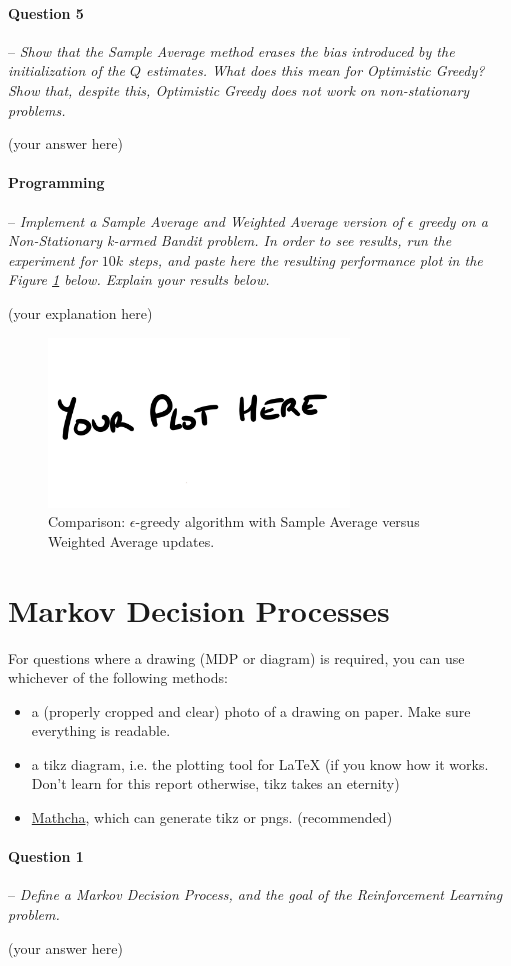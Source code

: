 \documentclass[a4paper]{article}
\newcommand{\question}[2]{
\paragraph{Question #1} -- \textit{#2}

}
\newcommand{\programming}[1]{
\paragraph{Programming} -- \textit{#1}

}
\begin{document}
		\question{5}{Show that the Sample Average method erases the bias introduced by the initialization of the $Q$ estimates. 
				What does this mean for Optimistic Greedy? Show that, despite this, Optimistic Greedy does not work on non-stationary problems.}
			(your answer here)

		\programming{Implement a Sample Average and Weighted Average version of $\epsilon$ greedy on a Non-Stationary k-armed Bandit problem. 
				In order to see results, run the experiment for $10k$ steps, and paste here the resulting performance plot in the Figure \ref{fig:sa_vs_wa} below. 
				Explain your results below.}
			(your explanation here)
			\begin{figure}[H]
				\centering
				\includegraphics[width=8cm]{plots/your_plot_here.png}
				\caption{Comparison: $\epsilon$-greedy algorithm with Sample Average versus Weighted Average updates.}
				\label{fig:sa_vs_wa}
			\end{figure}{}


	\section{Markov Decision Processes}
		For questions where a drawing (MDP or diagram) is required, you can use whichever of the following methods:
		\begin{itemize}
			\item a (properly cropped and clear) photo of a drawing on paper. 
				Make sure everything is readable.
			\item a tikz diagram, i.e. the plotting tool for LaTeX (if you know how it works. Don't learn for this report otherwise, tikz takes an eternity)
			\item \href{www.mathcha.io}{Mathcha}, which can generate tikz or pngs. (recommended)
		\end{itemize}{}

		\question{1}{Define a Markov Decision Process, and the goal of the Reinforcement Learning problem.}
			(your answer here)
\end{document}
